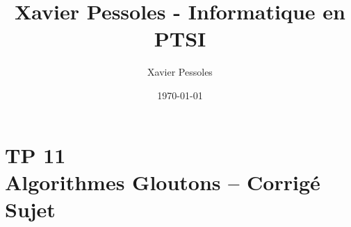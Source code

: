 \documentclass[
	fontsize=10pt, %
	twoside=true, %
]{kaobook}
\newcommand{\repRel}{../../../..}
\newcommand{\repStyle}{\repRel/Style}
\begin{document}

\titlehead{Xavier Pessoles - Informatique en PTSI}
\title[Xavier Pessoles - Informatique en PTSI]{Xavier Pessoles - Informatique en PTSI}
\author[XP]{Xavier Pessoles}
\date{\today}


\begingroup %
\endgroup

%
\mainmatter %
%
%
%
%


\setcounter{margintocdepth}{\sectiontocdepth}
\marginlayout
\graphicspath{{\repStyle/png}}

\pagestyle{xp.scrheadings}


%



\newcommand{\repExo}{}
\newcommand{\nomExo}{}

\livrettrue %
\livrettrue
\colletrue


\renewcommand{\repExo}{\repRel/Informatique/Exercices/S1_06_Gloutons/}
\renewcommand{\nomExo}{07_Glouton_2023}
\graphicspath{{\repStyle/png}{\repExo\nomExo/images}}


\chapter*{TP 11 \\ 
Algorithmes Gloutons -- \ifprof Corrigé \else Sujet \fi}
\end{document}
